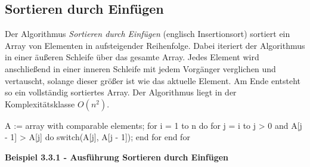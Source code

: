 \subsection{Sortieren durch Einfügen}
Der Algorithmus \textit{Sortieren durch Einfügen} (englisch Insertionsort) sortiert ein Array von Elementen in aufsteigender Reihenfolge. Dabei iteriert der Algorithmus in einer äußeren Schleife über das gesamte Array. Jedes Element wird anschließend in einer inneren Schleife mit jedem Vorgänger verglichen und vertauscht, solange dieser größer ist wie das aktuelle Element. Am Ende entsteht so ein vollständig sortiertes Array. Der Algorithmus liegt in der Komplexitätsklasse $O(n^2)$.

\begin{PseudoCode}
	A := array with comparable elements;
	for i = 1 to n do
		for j = i to j > 0 and A[j - 1] > A[j] do
			switch(A[j], A[j - 1]);
		end for
	end for
\end{PseudoCode}

\noindent
\textbf{Beispiel 3.3.1 - Ausführung Sortieren durch Einfügen}

